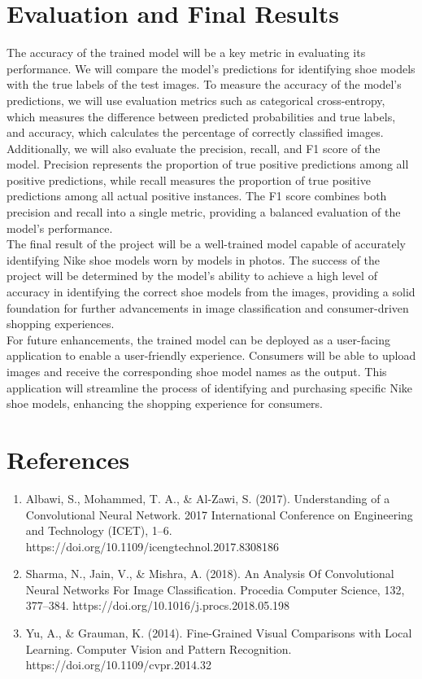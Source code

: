 \documentclass[11pt,a4paper]{article}
\begin{document}
\section{Evaluation and Final Results} 
The accuracy of the trained model will be a key metric in evaluating its performance. We will compare the model's predictions for identifying shoe models with the true labels of the test images. To measure the accuracy of the model's predictions, we will use evaluation metrics such as categorical cross-entropy, which measures the difference between predicted probabilities and true labels, and accuracy, which calculates the percentage of correctly classified images. Additionally, we will also evaluate the precision, recall, and F1 score of the model. Precision represents the proportion of true positive predictions among all positive predictions, while recall measures the proportion of true positive predictions among all actual positive instances. The F1 score combines both precision and recall into a single metric, providing a balanced evaluation of the model's performance. \\

  
  

The final result of the project will be a well-trained model capable of accurately identifying Nike shoe models worn by models in photos. The success of the project will be determined by the model's ability to achieve a high level of accuracy in identifying the correct shoe models from the images, providing a solid foundation for further advancements in image classification and consumer-driven shopping experiences. \\

  
  

For future enhancements, the trained model can be deployed as a user-facing application to enable a user-friendly experience. Consumers will be able to upload images and receive the corresponding shoe model names as the output. This application will streamline the process of identifying and purchasing specific Nike shoe models, enhancing the shopping experience for consumers. 
\section{References} 
		\begin{enumerate}
		\item Albawi, S., Mohammed, T. A., \& Al-Zawi, S. (2017). Understanding of a Convolutional Neural Network. 2017 International Conference on Engineering and Technology (ICET), 1–6. https://doi.org/10.1109/icengtechnol.2017.8308186  
		\item Sharma, N., Jain, V., \& Mishra, A. (2018). An Analysis Of Convolutional Neural Networks For Image Classification. Procedia Computer Science, 132, 377–384. https://doi.org/10.1016/j.procs.2018.05.198
		\item Yu, A., \& Grauman, K. (2014). Fine-Grained Visual Comparisons with Local Learning. Computer Vision and Pattern Recognition. https://doi.org/10.1109/cvpr.2014.32 
		\end{enumerate}
\end{document}
